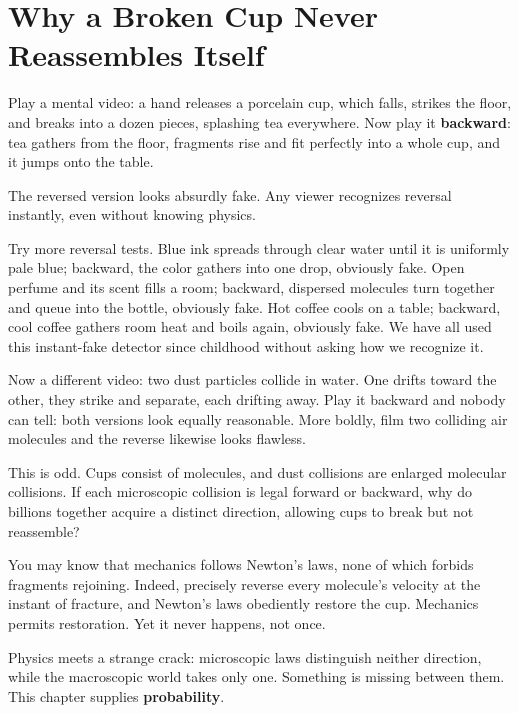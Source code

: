 \chapter{Why a Broken Cup Never Reassembles Itself}


Play a mental video: a hand releases a porcelain cup, which falls, strikes the floor, and breaks into a dozen pieces, splashing tea everywhere. Now play it \textbf{backward}: tea gathers from the floor, fragments rise and fit perfectly into a whole cup, and it jumps onto the table.

The reversed version looks absurdly fake. Any viewer recognizes reversal instantly, even without knowing physics.

Try more reversal tests. Blue ink spreads through clear water until it is uniformly pale blue; backward, the color gathers into one drop, obviously fake. Open perfume and its scent fills a room; backward, dispersed molecules turn together and queue into the bottle, obviously fake. Hot coffee cools on a table; backward, cool coffee gathers room heat and boils again, obviously fake. We have all used this instant-fake detector since childhood without asking how we recognize it.

Now a different video: two dust particles collide in water. One drifts toward the other, they strike and separate, each drifting away. Play it backward and nobody can tell: both versions look equally reasonable. More boldly, film two colliding air molecules and the reverse likewise looks flawless.

This is odd. Cups consist of molecules, and dust collisions are enlarged molecular collisions. If each microscopic collision is legal forward or backward, why do billions together acquire a distinct direction, allowing cups to break but not reassemble?

You may know that mechanics follows Newton's laws, none of which forbids fragments rejoining. Indeed, precisely reverse every molecule's velocity at the instant of fracture, and Newton's laws obediently restore the cup. Mechanics permits restoration. Yet it never happens, not once.

\begin{mainline}
Physics meets a strange crack: microscopic laws distinguish neither direction, while the macroscopic world takes only one. Something is missing between them. This chapter supplies \textbf{probability}.
\end{mainline}


